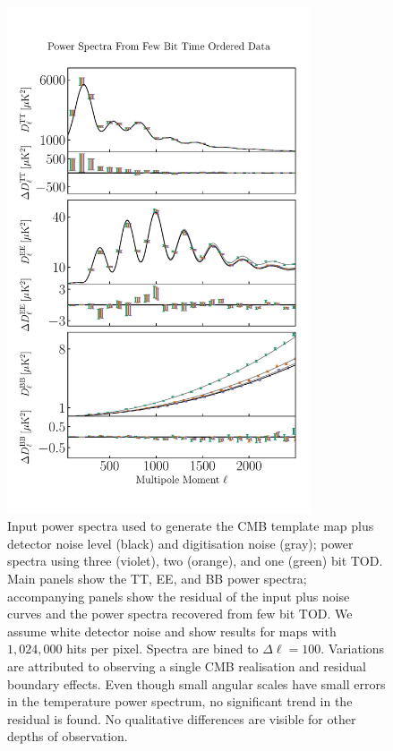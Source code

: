 \documentclass[apj]{emulateapj}
\begin{document}
\begin{figure}[h!t]\centering
\vspace{-1.5cm}
\includegraphics[width=0.8\textwidth,clip]{Plots/psrecovery.pdf}
  \caption[Current ]{
     Input power spectra used to generate the CMB template map plus detector noise level (black) and digitisation noise (gray); power spectra using three (violet), two (orange), and one (green) bit TOD. Main panels show the TT, EE, and BB power spectra; accompanying panels show the residual of the input plus noise curves and the power spectra recovered from few bit TOD. We assume white detector noise and show results for maps with $1,024,000$ hits per pixel. Spectra are bined to $\Delta \ell = 100$. Variations are attributed to observing a single CMB realisation and residual boundary effects. Even though small angular scales have small errors in the temperature power spectrum, no significant trend in the residual is found. No qualitative differences are visible for other depths of observation.
\label{fig:psrecover}
}
\end{figure}
\end{document}

